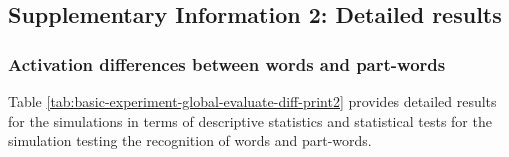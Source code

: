 \documentclass[
]{article}
\begin{document}
\clearpage

\hypertarget{supplementary-information-2-detailed-results}{%
\subsection{Supplementary Information 2: Detailed
results}\label{supplementary-information-2-detailed-results}}

\hypertarget{activation-differences-between-words-and-part-words}{%
\subsubsection{Activation differences between words and
part-words}\label{activation-differences-between-words-and-part-words}}

Table \ref{tab:basic-experiment-global-evaluate-diff-print2} provides
detailed results for the simulations in terms of descriptive statistics
and statistical tests for the simulation testing the recognition of
words and part-words.
\end{document}
